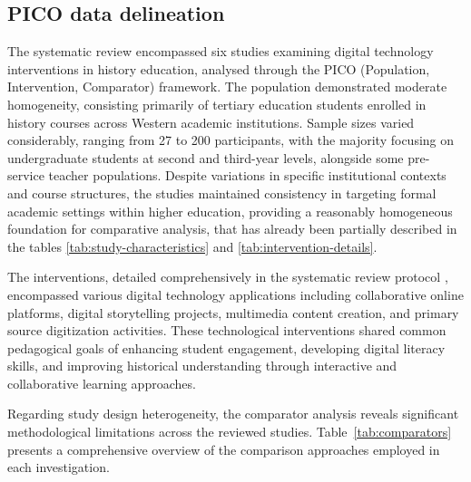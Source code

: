 \documentclass[
hf,
]{ceurart}
\begin{document}
\subsection{PICO data delineation }

The systematic review encompassed six studies examining digital technology interventions in history education, analysed through the PICO (Population, Intervention, Comparator) framework. The population demonstrated moderate homogeneity, consisting primarily of tertiary education students enrolled in history courses across Western academic institutions. Sample sizes varied considerably, ranging from 27 to 200 participants, with the majority focusing on undergraduate students at second and third-year levels, alongside some pre-service teacher populations. Despite variations in specific institutional contexts and course structures, the studies maintained consistency in targeting formal academic settings within higher education, providing a reasonably homogeneous foundation for comparative analysis, that has already been partially described in the tables \ref{tab:study-characteristics} and \ref{tab:intervention-details}.

The interventions, detailed comprehensively in the systematic review protocol \cite{zenodo}, encompassed various digital technology applications including collaborative online platforms, digital storytelling projects, multimedia content creation, and primary source digitization activities. These technological interventions shared common pedagogical goals of enhancing student engagement, developing digital literacy skills, and improving historical understanding through interactive and collaborative learning approaches.

Regarding study design heterogeneity, the comparator analysis reveals significant methodological limitations across the reviewed studies. Table~\ref{tab:comparators} presents a comprehensive overview of the comparison approaches employed in each investigation.
\end{document}
